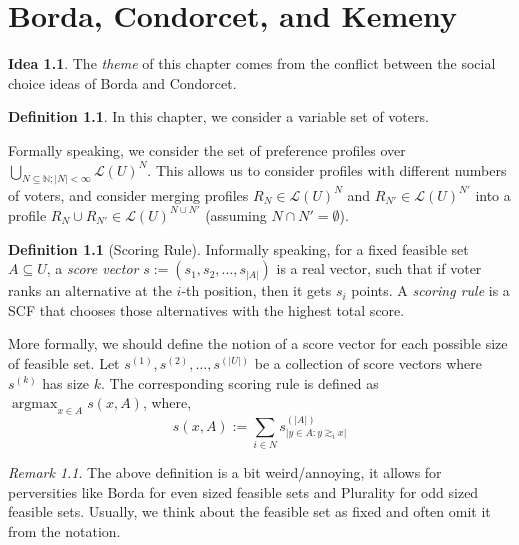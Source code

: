 \documentclass{book}
\theoremstyle{plain}
\theoremstyle{definition}
\newtheorem{definition}[theorem]{Definition}
\newtheorem{idea}[theorem]{Idea}
\theoremstyle{remark}
\newtheorem{remark}[theorem]{Remark}
\begin{document}
\chapter{Borda, Condorcet, and Kemeny}

\begin{idea}    
    The \emph{theme} of this chapter
    comes from the conflict between 
    the social choice ideas of 
    Borda and Condorcet.
\end{idea}

\begin{definition}
    In this chapter,
    we consider a variable set of voters.

    Formally speaking, 
    we consider the set of preference profiles over 
    $\bigcup_{N \subseteq \mathbb{N}; |N| < \infty} \mathcal{L}(U)^N$.
    This allows us to 
    consider profiles with different numbers of voters, and 
    consider merging
    profiles $R_N \in \mathcal{L}(U)^N$
    and $R_{N'} \in \mathcal{L}(U)^{N'}$ into a profile $R_{N} \cup R_{N'} \in \mathcal{L}(U)^{N \cup N'}$
    (assuming $N \cap N' = \emptyset$).
\end{definition}

\begin{definition}[Scoring Rule]
    Informally speaking, 
    for a fixed feasible set 
    $A \subseteq U$,
    a \emph{score vector} $s := (s_1, s_2, \ldots, s_{|A|})$ is a real vector, 
    such that if voter ranks an alternative 
    at the $i$-th position, then it gets $s_i$ points.
    A \emph{scoring rule} is a SCF that chooses those 
    alternatives with the highest total score.

    More formally, 
    we should define the notion of a score vector for each possible size of feasible set.
    Let 
    $s^{(1)}, s^{(2)}, \ldots, s^{(|U|)}$
    be a collection of score vectors where 
    $s^{(k)}$ has size $k$.
    The corresponding scoring rule is defined as
    $\operatorname{argmax}_{x \in A} s(x, A)$, 
    where, 
    \[
        s(x, A) := \sum_{i \in N} s_{|y \in A: y \gtrsim_i x|}^{(|A|)}
    \]

\end{definition}

\begin{remark}
    The above definition is a bit weird/annoying, 
    it allows for perversities like 
    Borda for even sized 
    feasible sets and Plurality for odd sized feasible sets.
    Usually, we think about the feasible set as fixed and 
    often omit it from the notation.
\end{remark}
\end{document}
